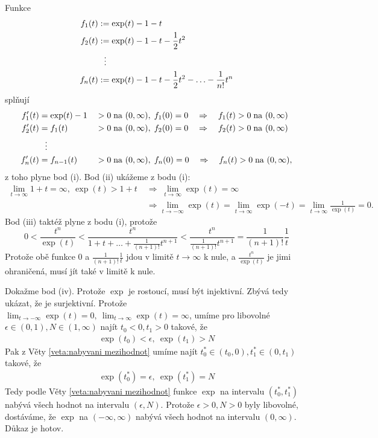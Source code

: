 \begin{důkaz}
Funkce
\begin{align*}
	f_1(t)&:= \exp(t)-1-t \\
	f_2(t)&:= \exp(t)-1-t-\frac{1}{2}t^{2} \\
	      &\hspace{.7em} \vdots \\
	f_n(t)&:= \exp(t)-1-t-\frac{1}{2}t^{2}-\hdots-\frac{1}{n!}t^{n}
\end{align*}
splňují
\begin{alignat*}{4}
	f_1'(t) &= \exp(t)-1 &&>0\; \text{na } (0,\infty),\; f_1(0)=0\quad \Rightarrow\quad f_1(t)>0\; \text{na } (0,\infty) \\
	f_2'(t) &= f_1(t)&&>0\; \text{na } (0,\infty),\; f_2(0)=0\quad \Rightarrow\quad f_2(t)>0\; \text{na } (0,\infty) \\
		&\hspace{.7em} \vdots & \\
	f_n'(t) &= f_{n-1}(t)&&>0\; \text{na } (0,\infty),\; f_{n}(0)=0\quad \Rightarrow\quad f_n(t)>0\; \text{na } (0,\infty),
\end{alignat*}
z toho plyne bod (i). Bod (ii) ukážeme z bodu (i):
\begin{align*}
	\lim_{t\to \infty}1+t=\infty,\ \exp(t)>1+t\; &\Rightarrow \; \lim_{t\to\infty}\exp(t)=\infty \\
							    &\Rightarrow \lim_{t\to -\infty}\exp(t)=\lim_{t\to \infty}\exp(-t)=\lim_{t\to\infty}\frac{1}{\exp(t)}=0.
\end{align*}
Bod (iii) taktéž plyne z bodu (i), protože
\begin{equation*}
  0<\frac{t^{n}}{\exp(t)}<\frac{t^{n}}{1+t+\hdots+\frac{1}{(n+1)!}t^{n+1}}<\frac{t^{n}}{\frac{1}{(n+1)!}t^{n+1}}=\frac{1}{(n+1)!}\frac{1}{t}
\end{equation*}
Protože obě funkce $0$ a $\frac{1}{(n+1)!}\frac{1}{t}$ jdou v limitě $t\to \infty$ k nule, a $\frac{t^{n}}{\exp(t)}$ je jimi ohraničená, musí jít také v limitě k nule.

  Dokažme bod (iv). Protože $\exp$ je rostoucí, musí být injektivní. Zbývá tedy ukázat, že je surjektivní. Protože $\lim_{t\to -\infty}\exp(t)=0,\ \lim_{t\to \infty}\exp(t)=\infty$, umíme pro libovolné $\epsilon\in(0,1), N\in(1,\infty)$ najít $t_0<0, t_1>0$ takové, že
  \begin{align*}
	\exp(t_0) < \epsilon,\ \exp(t_1)>N
  \end{align*}
  Pak z Věty \ref{veta:nabyvani mezihodnot} umíme najít $t_0^{*}\in (t_0,0), t_1^{*}\in (0,t_1)$ takové, že 
  \begin{align*}
	\exp(t_0^{*}) = \epsilon,\ \exp(t_1^{*})=N
  \end{align*}
  Tedy podle Věty \ref{veta:nabyvani mezihodnot} funkce $\exp$ na intervalu $(t_0^{*},t_1^{*})$ nabývá všech hodnot na intervalu $(\epsilon,N).$ Protože $\epsilon>0, N>0$ byly libovolné, dostáváme, že $\exp$ na $(-\infty, \infty)$ nabývá všech hodnot na intervalu $(0,\infty).$ Důkaz je hotov.
\end{důkaz}

